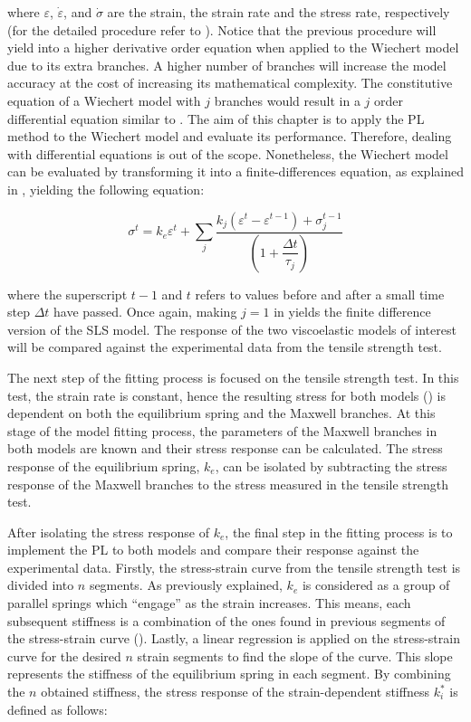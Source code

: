 \noindent where $\varepsilon$, $\dot{\varepsilon}$, and $\dot{\sigma}$ are the strain, the strain rate and the stress rate, respectively (for the detailed procedure refer to \cite{roylance2001engineering}). Notice that the previous procedure will yield into a higher derivative order equation when applied to the Wiechert model due to its extra branches. A higher number of branches will increase the model accuracy at the cost of increasing its mathematical complexity. The constitutive equation of a Wiechert model with $j$ branches would result in a $j$ order differential equation similar to . The aim of this chapter is to apply the PL method to the Wiechert model and evaluate its performance. Therefore, dealing with differential equations is out of the scope. Nonetheless, the Wiechert model can be evaluated by transforming it into a finite-differences equation, as explained in \cite{roylance2001engineering}, yielding the following equation:

\begin{equation}
    \label{eq4}
    \sigma^t = k_e\varepsilon^t + \sum_j \frac{k_j(\varepsilon^t - \varepsilon^{t-1}) + \sigma_j^{t-1}}{ \left( 1+\dfrac{\Delta t}{\tau_j} \right) }
\end{equation}

\noindent where the superscript $t-1$ and $t$ refers to values before and after a small time step $\Delta t$ have passed. Once again, making $j=1$ in  yields the finite difference version of the SLS model. The response of the two viscoelastic models of interest will be compared against the experimental data from the tensile strength test.

The next step of the fitting process is focused on the tensile strength test. In this test, the strain rate is constant, hence the resulting stress for both models () is dependent on both the equilibrium spring and the Maxwell branches. At this stage of the model fitting process, the parameters of the Maxwell branches in both models are known and their stress response can be calculated. The stress response of the equilibrium spring, $k_e$, can be isolated by subtracting the stress response of the Maxwell branches to the stress measured in the tensile strength test. 

After isolating the stress response of $k_e$, the final step in the fitting process is to implement the PL to both models and compare their response against the experimental data. Firstly, the stress-strain curve from the tensile strength test is divided into $n$ segments. As previously explained, $k_e$ is considered as a group of parallel springs which ``engage'' as the strain increases. This means, each subsequent stiffness is a combination of the ones found in previous segments of the stress-strain curve ().  Lastly, a linear regression is applied on the stress-strain curve for the desired $n$ strain segments to find the slope of the curve. This slope represents the stiffness of the equilibrium spring in each segment. By combining the $n$ obtained stiffness, the stress response of the strain-dependent stiffness $k_i^*$ is defined as follows:

